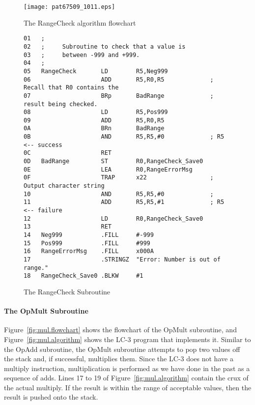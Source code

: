 \documentclass{patt}
\begin{document}
\begin{figure}
\centerline{\texttt{[image: pat67509\_1011.eps]}}
\caption{The RangeCheck algorithm flowchart}
\label{fig:flowchart.rangecheck}
\end{figure}

\begin{figure}
\begin{Verbatim}[fontsize=\fontsize{9}{11}\selectfont]
01   ;
02   ;     Subroutine to check that a value is
03   ;     between -999 and +999.
04   ;
05   RangeCheck       LD        R5,Neg999
06                    ADD       R5,R0,R5             ; Recall that R0 contains the
07                    BRp       BadRange             ; result being checked.
08                    LD        R5,Pos999
09                    ADD       R5,R0,R5
0A                    BRn       BadRange
0B                    AND       R5,R5,#0             ; R5 <-- success
0C                    RET
0D   BadRange         ST        R0,RangeCheck_Save0
0E                    LEA       R0,RangeErrorMsg
0F                    TRAP      x22                  ; Output character string
10                    AND       R5,R5,#0             ;
11                    ADD       R5,R5,#1             ; R5 <-- failure
12                    LD        R0,RangeCheck_Save0
13                    RET
14   Neg999           .FILL     #-999
15   Pos999           .FILL     #999
16   RangeErrorMsg    .FILL     x000A
17                    .STRINGZ  "Error: Number is out of range."
18   RangeCheck_Save0 .BLKW     #1
\end{Verbatim}
\caption{The RangeCheck Subroutine}
\label{fig:code.rangecheck}
\end{figure}

\FloatBarrier
\paragraph{The OpMult Subroutine}

Figure~\ref{fig:mul.flowchart} shows the flowchart of the OpMult
subroutine, and Figure~\ref{fig:mul.algorithm} shows the LC-3 program
that implements it. Similar to the OpAdd subroutine, the
OpMult subroutine attempts to pop two values off the stack and, if
successful, multiplies them. Since the LC-3 does not have a multiply
instruction, multiplication is performed as we have done in the past
as a sequence of adds. Lines 17 to 19 of
Figure~\ref{fig:mul.algorithm} contain the crux of the actual
multiply.  If the result is within the range of acceptable values,
then the result is pushed onto the stack.
\end{document}
